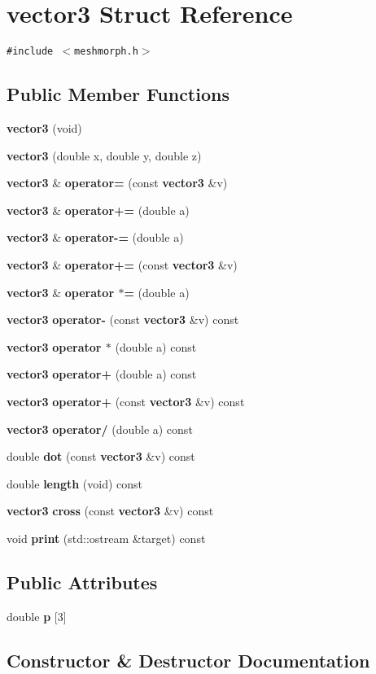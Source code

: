 \section{vector3 Struct Reference}
\label{structvector3}
{\tt \#include $<$meshmorph.h$>$}

\subsection*{Public Member Functions}
\begin{CompactItemize}
\item 
{\bf vector3} (void)
\item 
{\bf vector3} (double x, double y, double z)
\item 
{\bf vector3} \& {\bf operator=} (const {\bf vector3} \&v)
\item 
{\bf vector3} \& {\bf operator+=} (double a)
\item 
{\bf vector3} \& {\bf operator-=} (double a)
\item 
{\bf vector3} \& {\bf operator+=} (const {\bf vector3} \&v)
\item 
{\bf vector3} \& {\bf operator $\ast$=} (double a)
\item 
{\bf vector3} {\bf operator-} (const {\bf vector3} \&v) const
\item 
{\bf vector3} {\bf operator $\ast$} (double a) const
\item 
{\bf vector3} {\bf operator+} (double a) const
\item 
{\bf vector3} {\bf operator+} (const {\bf vector3} \&v) const
\item 
{\bf vector3} {\bf operator/} (double a) const
\item 
double {\bf dot} (const {\bf vector3} \&v) const
\item 
double {\bf length} (void) const
\item 
{\bf vector3} {\bf cross} (const {\bf vector3} \&v) const
\item 
void {\bf print} (std::ostream \&target) const
\end{CompactItemize}
\subsection*{Public Attributes}
\begin{CompactItemize}
\item 
double {\bf p} [3]
\end{CompactItemize}


\subsection{Constructor \& Destructor Documentation}
